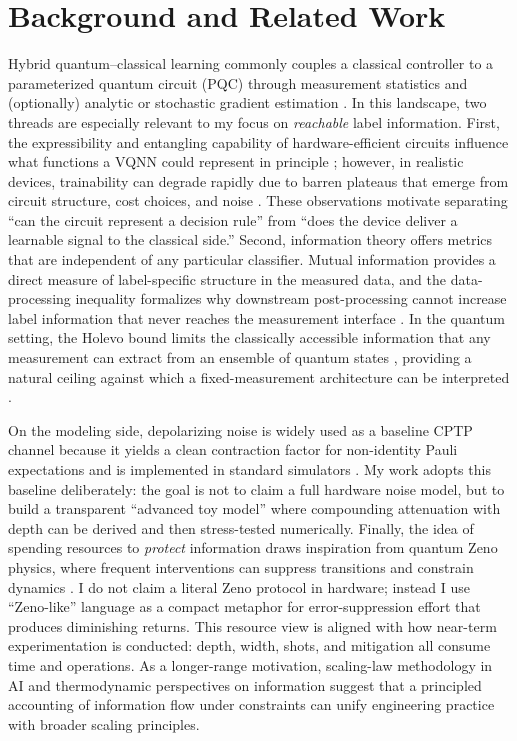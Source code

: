 \documentclass[]{ieeeaccess}
\begin{document}
\section{Background and Related Work}
Hybrid quantum--classical learning commonly couples a classical controller to a parameterized quantum circuit (PQC) through measurement statistics and (optionally) analytic or stochastic gradient estimation \cite{ref15,ref16}. In this landscape, two threads are especially relevant to my focus on \emph{reachable} label information. First, the expressibility and entangling capability of hardware-efficient circuits influence what functions a VQNN could represent in principle \cite{ref7}; however, in realistic devices, trainability can degrade rapidly due to barren plateaus that emerge from circuit structure, cost choices, and noise \cite{ref4,ref5,ref6}. These observations motivate separating ``can the circuit represent a decision rule'' from ``does the device deliver a learnable signal to the classical side.'' Second, information theory offers metrics that are independent of any particular classifier. Mutual information provides a direct measure of label-specific structure in the measured data, and the data-processing inequality formalizes why downstream post-processing cannot increase label information that never reaches the measurement interface \cite{ref3}. In the quantum setting, the Holevo bound limits the classically accessible information that any measurement can extract from an ensemble of quantum states \cite{ref2}, providing a natural ceiling against which a fixed-measurement architecture can be interpreted \cite{ref1}. 

On the modeling side, depolarizing noise is widely used as a baseline CPTP channel because it yields a clean contraction factor for non-identity Pauli expectations and is implemented in standard simulators \cite{ref8,ref9}. My work adopts this baseline deliberately: the goal is not to claim a full hardware noise model, but to build a transparent ``advanced toy model'' where compounding attenuation with depth can be derived and then stress-tested numerically. Finally, the idea of spending resources to \emph{protect} information draws inspiration from quantum Zeno physics, where frequent interventions can suppress transitions and constrain dynamics \cite{ref17,ref18}. I do not claim a literal Zeno protocol in hardware; instead I use ``Zeno-like'' language as a compact metaphor for error-suppression effort that produces diminishing returns. This resource view is aligned with how near-term experimentation is conducted: depth, width, shots, and mitigation all consume time and operations. As a longer-range motivation, scaling-law methodology in AI \cite{ref10,ref11} and thermodynamic perspectives on information \cite{ref12,ref13,ref14} suggest that a principled accounting of information flow under constraints can unify engineering practice with broader scaling principles.
\end{document}
